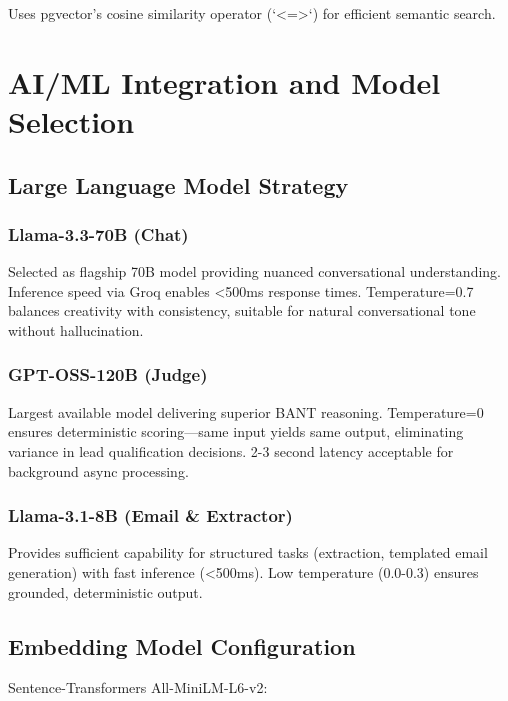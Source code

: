 \documentclass[10pt,twocolumn,a4paper]{article}
\begin{document}
Uses pgvector's cosine similarity operator (`<=>`) for efficient semantic search.


\section{AI/ML Integration and Model Selection}

\subsection{Large Language Model Strategy}

\subsubsection{Llama-3.3-70B (Chat)}

Selected as flagship 70B model providing nuanced conversational understanding. Inference speed via Groq enables <500ms response times. Temperature=0.7 balances creativity with consistency, suitable for natural conversational tone without hallucination.

\subsubsection{GPT-OSS-120B (Judge)}

Largest available model delivering superior BANT reasoning. Temperature=0 ensures deterministic scoring—same input yields same output, eliminating variance in lead qualification decisions. 2-3 second latency acceptable for background async processing.

\subsubsection{Llama-3.1-8B (Email \& Extractor)}

Provides sufficient capability for structured tasks (extraction, templated email generation) with fast inference (<500ms). Low temperature (0.0-0.3) ensures grounded, deterministic output.

\subsection{Embedding Model Configuration}

Sentence-Transformers All-MiniLM-L6-v2:
\end{document}
